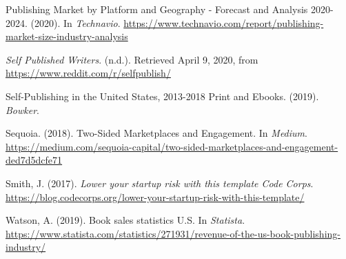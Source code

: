 \documentclass[10pt,openany]{book}
\newlength{\cslhangindent}
\newenvironment{cslreferences}%
  {\setlength{\parindent}{0pt}%
  \everypar{\setlength{\hangindent}{\cslhangindent}}\ignorespaces}%
  {\par}
\begin{document}
\begin{cslreferences}
\leavevmode\hypertarget{ref-technavio_publishing_nodate}{}%
Publishing Market by Platform and Geography - Forecast and Analysis
2020-2024. (2020). In \emph{Technavio}.
\url{https://www.technavio.com/report/publishing-market-size-industry-analysis}

\leavevmode\hypertarget{ref-noauthor_self_nodate}{}%
\emph{Self Published Writers}. (n.d.). Retrieved April 9, 2020, from
\url{https://www.reddit.com/r/selfpublish/}

\leavevmode\hypertarget{ref-bowker_self-publishing_2019}{}%
Self-Publishing in the United States, 2013-2018 Print and Ebooks.
(2019). \emph{Bowker}.

\leavevmode\hypertarget{ref-sequoia_two-sided_2018}{}%
Sequoia. (2018). Two-Sided Marketplaces and Engagement. In
\emph{Medium}.
\url{https://medium.com/sequoia-capital/two-sided-marketplaces-and-engagement-ded7d5dcfe71}

\leavevmode\hypertarget{ref-smith_lower_nodate}{}%
Smith, J. (2017). \emph{Lower your startup risk with this template Code
Corps}.
\url{https://blog.codecorps.org/lower-your-startup-risk-with-this-template/}

\leavevmode\hypertarget{ref-statista_book_2020}{}%
Watson, A. (2019). Book sales statistics U.S. In \emph{Statista}.
\url{https://www.statista.com/statistics/271931/revenue-of-the-us-book-publishing-industry/}
\end{cslreferences}

\end{document}
